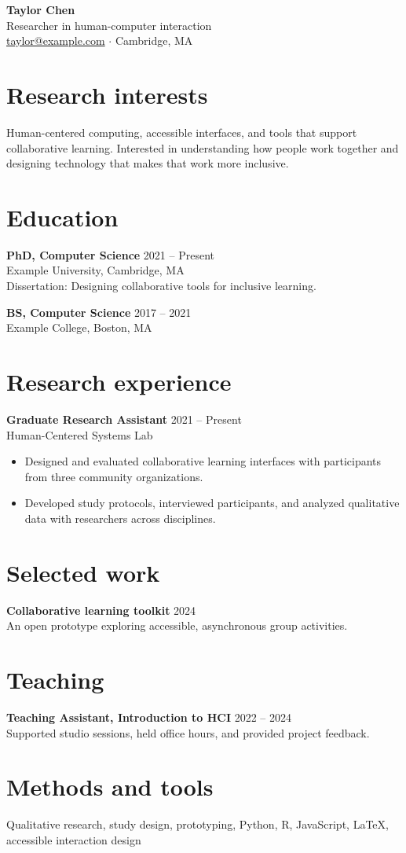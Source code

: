 \documentclass[11pt,a4paper]{article}
\begin{document}
{\LARGE\bfseries Taylor Chen}\\[5pt]
Researcher in human-computer interaction\\
\href{mailto:taylor@example.com}{taylor@example.com}
\enspace $\cdot$ \enspace Cambridge, MA

\section{Research interests}
Human-centered computing, accessible interfaces, and tools that support
collaborative learning. Interested in understanding how people work together
and designing technology that makes that work more inclusive.

\section{Education}
\textbf{PhD, Computer Science} \hfill 2021 -- Present\\
Example University, Cambridge, MA\\
Dissertation: Designing collaborative tools for inclusive learning.

\textbf{BS, Computer Science} \hfill 2017 -- 2021\\
Example College, Boston, MA

\section{Research experience}
\textbf{Graduate Research Assistant} \hfill 2021 -- Present\\
Human-Centered Systems Lab
\begin{itemize}
\item Designed and evaluated collaborative learning interfaces with
      participants from three community organizations.
\item Developed study protocols, interviewed participants, and analyzed
      qualitative data with researchers across disciplines.
\end{itemize}

\section{Selected work}
\textbf{Collaborative learning toolkit} \hfill 2024\\
An open prototype exploring accessible, asynchronous group activities.

\section{Teaching}
\textbf{Teaching Assistant, Introduction to HCI} \hfill 2022 -- 2024\\
Supported studio sessions, held office hours, and provided project feedback.

\section{Methods and tools}
Qualitative research, study design, prototyping, Python, R, JavaScript,
LaTeX, accessible interaction design
\end{document}
